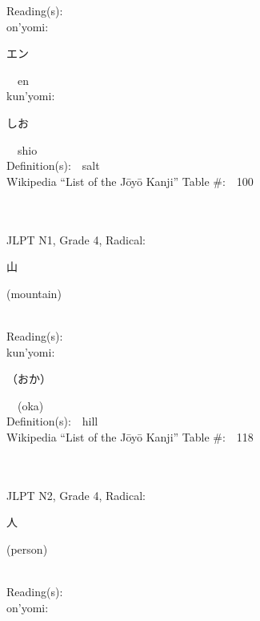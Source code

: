 \begin{multicols}{2}
Reading(s):\ \ \\
{\hspace*{1em}}on'yomi:\ \ \\
{\hspace*{2em}}{\begin{CJK}{UTF8}{min} エン \end{CJK}}\ \ en\ \ \\
{\hspace*{1em}}kun'yomi:\ \ \\
{\hspace*{2em}}{\begin{CJK}{UTF8}{min} しお \end{CJK}}\ \ shio\ \ \\
Definition(s):\ \ salt \\
Wikipedia ``List of the J\=oy\=o Kanji'' Table \#:\ \ 100 \\
\ \ \\
{\fontsize{34pt}{40pt}  }\ \ \\  %
{JLPT N1, Grade 4, Radical:\ \ {\begin{CJK}{UTF8}{min} 山 \end{CJK}} (mountain) } \\
Reading(s):\ \ \\
{\hspace*{1em}}kun'yomi:\ \ \\
{\hspace*{2em}}{\begin{CJK}{UTF8}{min} （おか） \end{CJK}}\ \ (oka)\ \ \\
Definition(s):\ \ hill \\
Wikipedia ``List of the J\=oy\=o Kanji'' Table \#:\ \ 118 \\
\ \ \\
{\fontsize{34pt}{40pt}  }\ \ \\  %
{JLPT N2, Grade 4, Radical:\ \ {\begin{CJK}{UTF8}{min} 人 \end{CJK}} (person) } \\
Reading(s):\ \ \\
{\hspace*{1em}}on'yomi:\ \ \\

\end{multicols}
